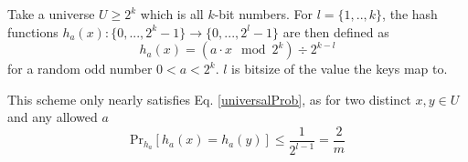 \documentclass[../../main.tex]{subfiles}
\begin{document}
\noindent Take a universe $U\geq 2^k$ which is all $k$-bit numbers. For $l=\{1,..,k\}$, the hash functions $h_a(x):\{0,...,2^k-1\}\rightarrow\{0,...,2^l-1\}$ are then defined as
\begin{equation}\label{dietzhash}
h_a(x)=(a\cdot x \mod 2^k) \div 2^{k-l}
\end{equation}
\noindent for a random odd number $0<a<2^k$. $l$ is bitsize of the value the keys map to. 

This scheme only nearly satisfies Eq. \ref{universalProb}, as for two distinct $x,y\in U$ and any allowed $a$
\begin{equation}\label{probDietz}
\mathrm{Pr}_{h_a}[h_a(x)=h_a(y)]\leq \frac{1}{2^{l-1}}=\frac{2}{m}
\end{equation}
\end{document}
